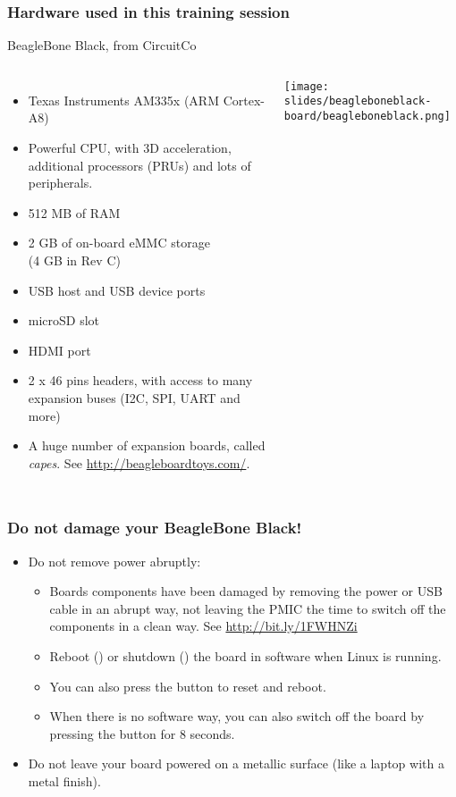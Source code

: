 \begin{frame}
\frametitle{Hardware used in this training session}
  BeagleBone Black, from CircuitCo
  \begin{columns}
    \footnotesize
    \begin{itemize}
      \item Texas Instruments AM335x (ARM Cortex-A8)
      \item Powerful CPU, with 3D acceleration, additional processors
        (PRUs) and lots of peripherals.
      \item 512 MB of RAM
      \item 2 GB of on-board eMMC storage\\
            (4 GB in Rev C)
      \item USB host and USB device ports
      \item microSD slot
      \item HDMI port
      \item 2 x 46 pins headers, with access to many expansion buses
        (I2C, SPI, UART and more)
      \item A huge number of expansion boards, called {\em capes}.
        See \url{http://beagleboardtoys.com/}.
    \end{itemize}
    \texttt{[image: slides/beagleboneblack-board/beagleboneblack.png]}
  \end{columns}
\end{frame}

\begin{frame}
\frametitle{Do not damage your BeagleBone Black!}
\begin{itemize}
  \item Do not remove power abruptly:
  \begin{itemize}
     \item Boards components have been damaged by removing the power or
           USB cable in an abrupt way, not leaving the PMIC the time to
           switch off the components in a clean way. See
           \url{http://bit.ly/1FWHNZi}
     \item Reboot () or shutdown () the board
	   in software when Linux is running.
     \item You can also press the  button to reset and
	   reboot.
     \item When there is no software way, you can also switch off
	   the board by pressing the  button for 8 seconds.
  \end{itemize}
  \item Do not leave your board powered on a metallic surface (like a
        laptop with a metal finish).
\end{itemize}
\end{frame}

